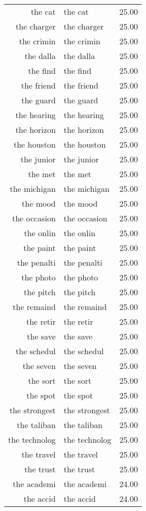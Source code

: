 \begin{table}[ht]
\begin{tabular}{rlr}
  the cat & the cat & 25.00 \\ 
  the charger & the charger & 25.00 \\ 
  the crimin & the crimin & 25.00 \\ 
  the dalla & the dalla & 25.00 \\ 
  the find & the find & 25.00 \\ 
  the friend & the friend & 25.00 \\ 
  the guard & the guard & 25.00 \\ 
  the hearing & the hearing & 25.00 \\ 
  the horizon & the horizon & 25.00 \\ 
  the houston & the houston & 25.00 \\ 
  the junior & the junior & 25.00 \\ 
  the met & the met & 25.00 \\ 
  the michigan & the michigan & 25.00 \\ 
  the mood & the mood & 25.00 \\ 
  the occasion & the occasion & 25.00 \\ 
  the onlin & the onlin & 25.00 \\ 
  the paint & the paint & 25.00 \\ 
  the penalti & the penalti & 25.00 \\ 
  the photo & the photo & 25.00 \\ 
  the pitch & the pitch & 25.00 \\ 
  the remaind & the remaind & 25.00 \\ 
  the retir & the retir & 25.00 \\ 
  the save & the save & 25.00 \\ 
  the schedul & the schedul & 25.00 \\ 
  the seven & the seven & 25.00 \\ 
  the sort & the sort & 25.00 \\ 
  the spot & the spot & 25.00 \\ 
  the strongest & the strongest & 25.00 \\ 
  the taliban & the taliban & 25.00 \\ 
  the technolog & the technolog & 25.00 \\ 
  the travel & the travel & 25.00 \\ 
  the trust & the trust & 25.00 \\ 
  the academi & the academi & 24.00 \\ 
  the accid & the accid & 24.00 \\ 

\end{tabular}
\end{table}
